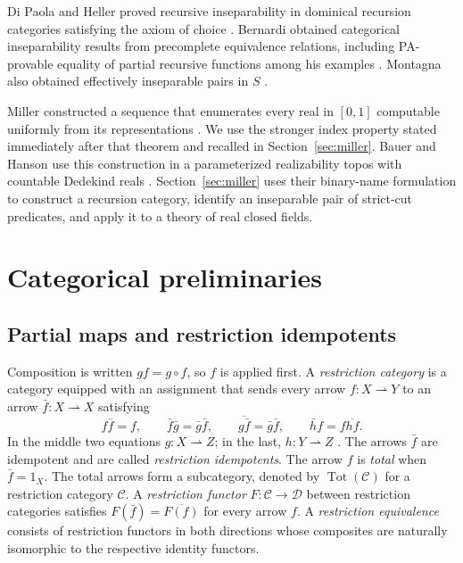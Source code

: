 \documentclass[11pt]{article}
\begin{document}
Di Paola and Heller proved recursive inseparability in dominical
recursion categories satisfying the axiom of choice
\cite[Theorem 8.15]{DPH}. Bernardi obtained categorical inseparability
results from precomplete equivalence relations, including PA-provable
equality of partial recursive functions among his examples
\cite[pp.~125--128]{Bernardi}.
Montagna also obtained effectively inseparable pairs in $S$
\cite[Remark 3.1]{Montagna}.


Miller constructed a sequence that enumerates every real in $[0,1]$
computable uniformly from its representations \cite[Theorem~6.3]{Miller2004}.
We use the stronger index property stated immediately after that
theorem and recalled in Section~\ref{sec:miller}.
Bauer and Hanson use this construction in a parameterized realizability
topos with countable Dedekind reals \cite{BauerHanson}.
Section~\ref{sec:miller} uses their binary-name formulation to construct
a recursion category, identify an inseparable pair of strict-cut
predicates, and apply it to a theory of real closed fields.

\section{Categorical preliminaries}\label{sec:preliminaries}

\subsection{Partial maps and restriction idempotents}

Composition is written $gf=g\circ f$, so $f$ is applied first.
A \emph{restriction category} is a category equipped with an assignment
that sends every arrow
$f:X\rightharpoonup Y$ to an arrow
$\bar f:X\rightharpoonup X$ satisfying
\[
 f\bar f=f,\qquad
 \bar f\bar g=\bar g\bar f,\qquad
 \overline{g\bar f}=\bar g\bar f,\qquad
 \bar h f=f\overline{hf}.
\]
In the middle two equations $g:X\rightharpoonup Z$; in the last,
$h:Y\rightharpoonup Z$ \cite{CockettLack}.
The arrows $\bar f$ are idempotent and are called
\emph{restriction idempotents}.
The arrow $f$ is \emph{total} when $\bar f=1_X$.
The total arrows form a subcategory, denoted by
$\operatorname{Tot}(\mathcal C)$ for a restriction category $\mathcal C$.
A \emph{restriction functor} $F:\mathcal C\to\mathcal D$ between
restriction categories satisfies $F(\bar f)=\overline{F(f)}$ for every
arrow $f$. A \emph{restriction equivalence} consists of restriction
functors in both directions whose composites are naturally isomorphic
to the respective identity functors.
\end{document}
